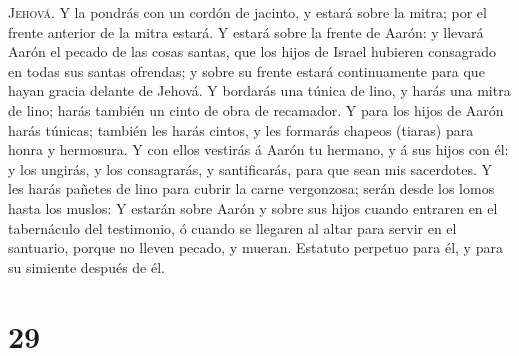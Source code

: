 \textsc{Jehová}.  Y la pondrás con un cordón de jacinto,
y estará sobre la mitra; por el frente anterior de la mitra estará.
 Y estará sobre la frente de Aarón: y llevará Aarón el
pecado de las cosas santas, que los hijos de Israel hubieren consagrado
en todas sus santas ofrendas; y sobre su frente estará continuamente
para que hayan gracia delante de Jehová.  Y bordarás una
túnica de lino, y harás una mitra de lino; harás también un cinto de
obra de recamador.  Y para los hijos de Aarón harás
túnicas; también les harás cintos, y les formarás chapeos (tiaras) para
honra y hermosura.  Y con ellos vestirás á Aarón tu
hermano, y á sus hijos con él: y los ungirás, y los consagrarás, y
santificarás, para que sean mis sacerdotes.  Y les harás
pañetes de lino para cubrir la carne vergonzosa; serán desde los lomos
hasta los muslos:  Y estarán sobre Aarón y sobre sus
hijos cuando entraren en el tabernáculo del testimonio, ó cuando se
llegaren al altar para servir en el santuario, porque no lleven pecado,
y mueran. Estatuto perpetuo para él, y para su simiente después de él.

\hypertarget{section-28}{%
\section{29}\label{section-28}}


